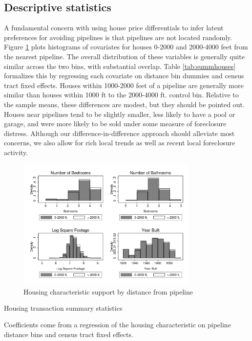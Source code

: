 \documentclass[12pt]{article}
\begin{document}
\subsection{Descriptive statistics}

A fundamental concern with using house price differentials to infer
latent preferences for avoiding pipelines is that pipelines are not
located randomly. Figure \ref{fig:overlap} plots histograms of covariates
for houses 0-2000 and 2000-4000 feet from the nearest pipeline. The
overall distribution of these variables is generally quite similar
across the two bins, with substantial overlap. Table \ref{tab:summhouses}
formalizes this by regressing each covariate on distance bin dummies
and census tract fixed effects. Houses within 1000-2000 feet of a
pipeline are generally more similar than houses within 1000 ft to
the 2000-4000 ft. control bin. Relative to the sample means, these
differences are modest, but they should be pointed out. Houses near
pipelines tend to be slightly smaller, less likely to have a pool
or garage, and were more likely to be sold under some measure of foreclosure
distress. Although our difference-in-difference approach should alleviate
most concerns, we also allow for rich local trends as well as recent
local foreclosure activity. 

\begin{figure}[H]
\caption{Housing characteristic support by distance from pipeline\label{fig:overlap}}
\centering{}\includegraphics[width=0.8\textwidth]{../output/overlap_bw}
\end{figure}
\begin{table}[H]
\caption{Housing transaction summary statistics\label{tab:summhouses}}

\centering \footnotesize



\scriptsize

Coefficients come from a regression of the housing characteristic
on pipeline distance bins and census tract fixed effects.
\end{table}
\end{document}
